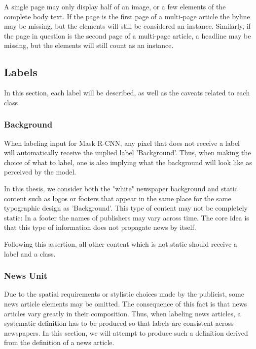 \documentclass[oneside, english, bibtex]{kththesis}
\begin{document}
A single page may only display half of an image, or a few elements of the complete body text.
If the page is the first page of a multi-page article the byline may be missing, but the elements will still be considered an instance.
Similarly, if the page in question is the second page of a multi-page article, a headline may be missing, but the elements will still count as an instance.

\subsection{Labels}

In this section, each label will be described, as well as the caveats related to each class.

\subsubsection{Background}

When labeling input for Mask R-CNN, any pixel that does not receive a label will automatically receive the implied label 'Background'.
Thus, when making the choice of what to label, one is also implying what the background will look like as perceived by the model.

In this thesis, we consider both the "white" newspaper background and static content such as logos or footers that appear in the same place for the same typographic design as 'Background'.
This type of content may not be completely static: In a footer the names of publishers may vary across time. The core idea is that this type of information does not propagate news by itself.

Following this assertion, all other content which is not static should receive a label and a class.

\subsubsection{News Unit}

Due to the spatial requirements or stylistic choices made by the publicist, some news article elements may be omitted.
The consequence of this fact is that news articles vary greatly in their composition.
Thus, when labeling news articles, a systematic definition has to be produced so that labels are consistent across newspapers.
In this section, we will attempt to produce such a definition derived from the definition of a news article.

\newtheorem{lemma}{Lemma}[chapter]
\newcommand{\lemmaautorefname}{Lemma}
\newtheorem{definition}[lemma]{Definition}
\newcommand{\definitionautorefname}{Definition}
\end{document}
